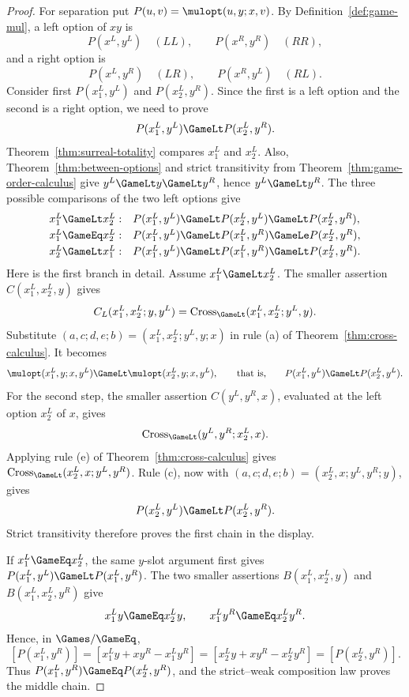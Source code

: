 \begin{proof}
  For separation put \(P(u,v)=\mulopt(u,y;x,v)\).  By
  Definition~\ref{def:game-mul}, a left option of \(xy\) is
  \[
    P(x^L,y^L)\quad(LL),\qquad P(x^R,y^R)\quad(RR),
  \]
  and a right option is
  \[
    P(x^L,y^R)\quad(LR),\qquad P(x^R,y^L)\quad(RL).
  \]
  Consider first \(P(x^L_1,y^L)\) and \(P(x^L_2,y^R)\).  Since the first is a
  left option and the second is a right option, we need to prove
  \[
    P(x^L_1,y^L)\GameLt P(x^L_2,y^R).
  \]
  Theorem~\ref{thm:surreal-totality} compares \(x^L_1\) and \(x^L_2\).
  Also, Theorem~\ref{thm:between-options} and strict transitivity from
  Theorem~\ref{thm:game-order-calculus} give
  \(y^L\GameLt y\GameLt y^R\), hence \(y^L\GameLt y^R\).
  The three possible comparisons of the two left options give
  \[
    \begin{array}{ll}
    x^L_1\GameLt x^L_2:
      &P(x^L_1,y^L)\GameLt P(x^L_2,y^L)
         \GameLt P(x^L_2,y^R),\\[1mm]
    x^L_1\GameEq x^L_2:
      &P(x^L_1,y^L)\GameLt P(x^L_1,y^R)
         \GameLe P(x^L_2,y^R),\\[1mm]
    x^L_2\GameLt x^L_1:
      &P(x^L_1,y^L)\GameLt P(x^L_1,y^R)
         \GameLt P(x^L_2,y^R).
    \end{array}
  \]
  Here is the first branch in detail.  Assume \(x^L_1\GameLt x^L_2\).  The
  smaller assertion \(C(x^L_1,x^L_2,y)\) gives
  \[
    C_L(x^L_1,x^L_2;y,y^L)
      =\operatorname{Cross}_{\GameLt}(x^L_1,x^L_2;y^L,y).
  \]
  Substitute
  \((a,c;d,e;b)=(x^L_1,x^L_2;y^L,y;x)\) in rule \textup{(a)} of
  Theorem~\ref{thm:cross-calculus}.  It becomes
  \[
    \mulopt(x^L_1,y;x,y^L)\GameLt\mulopt(x^L_2,y;x,y^L),
    \qquad\text{that is,}\qquad
    P(x^L_1,y^L)\GameLt P(x^L_2,y^L).
  \]
  For the second step, the smaller assertion \(C(y^L,y^R,x)\), evaluated at
  the left option \(x^L_2\) of \(x\), gives
  \[
    \operatorname{Cross}_{\GameLt}(y^L,y^R;x^L_2,x).
  \]
  Applying rule \textup{(e)} of Theorem~\ref{thm:cross-calculus} gives
  \(\operatorname{Cross}_{\GameLt}(x^L_2,x;y^L,y^R)\).  Rule \textup{(c)},
  now with
  \((a,c;d,e;b)=(x^L_2,x;y^L,y^R;y)\), gives
  \[
    P(x^L_2,y^L)\GameLt P(x^L_2,y^R).
  \]
  Strict transitivity therefore proves the first chain in the display.

  If \(x^L_1\GameEq x^L_2\), the same \(y\)-slot argument first gives
  \(P(x^L_1,y^L)\GameLt P(x^L_1,y^R)\).  The two smaller assertions
  \(B(x^L_1,x^L_2,y)\) and \(B(x^L_1,x^L_2,y^R)\) give
  \[
    x^L_1y\GameEq x^L_2y,
    \qquad
    x^L_1y^R\GameEq x^L_2y^R.
  \]
  Hence, in \(\Games/{\GameEq}\),
  \[
    [P(x^L_1,y^R)]
      =[x^L_1y+xy^R-x^L_1y^R]
      =[x^L_2y+xy^R-x^L_2y^R]
      =[P(x^L_2,y^R)].
  \]
  Thus \(P(x^L_1,y^R)\GameEq P(x^L_2,y^R)\), and the strict--weak
  composition law proves the middle chain.


\end{proof}
